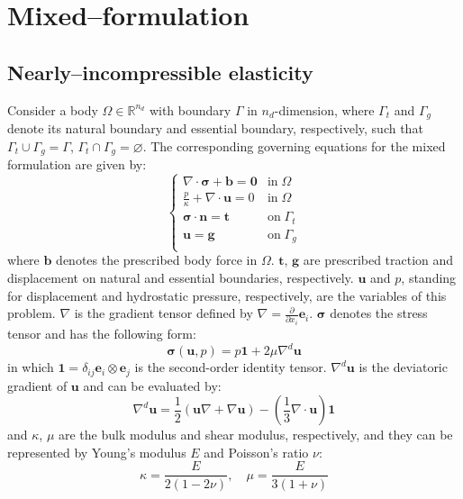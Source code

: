 \section{Mixed--formulation}
\subsection{Nearly--incompressible elasticity}
Consider a body $\Omega \in \mathbb{R}^{n_d}$ with boundary $\Gamma$ in $n_d$-dimension, where $\Gamma_t$ and $\Gamma_g$ denote its natural boundary and essential boundary, respectively, such that $\Gamma_t \cup \Gamma_g = \Gamma$, $\Gamma_t \cap \Gamma_g = \varnothing$. The corresponding governing equations for the mixed formulation are given by:
\begin{equation}\label{strong}
\begin{cases}
\nabla \cdot \boldsymbol{\sigma} + \boldsymbol{b} = \boldsymbol{0} & \mathrm{in} \; \Omega \\
\frac{p}{\kappa} + \nabla \cdot \boldsymbol{u} = 0 & \mathrm{in} \; \Omega \\
\boldsymbol{\sigma} \cdot \boldsymbol{n} = \boldsymbol{t} & \mathrm{on} \; \Gamma_t \\
\boldsymbol{u} = \boldsymbol{g} & \mathrm{on} \; \Gamma_g \\
\end{cases}
\end{equation}
where $\boldsymbol{b}$ denotes the prescribed body force in $\Omega$. $\boldsymbol{t}$, $\boldsymbol{g}$ are prescribed traction and displacement on natural and essential boundaries, respectively.
$\boldsymbol{u}$ and $p$, standing for displacement and hydrostatic pressure, respectively, are the variables of this problem.
$\nabla$ is the gradient tensor defined by $\nabla = \frac{\partial}{\partial x_i} \boldsymbol{e}_i$.
$\boldsymbol{\sigma}$ denotes the stress tensor and has the following form:
\begin{equation}\label{stress}
\boldsymbol{\sigma}(\boldsymbol{u}, p) = p \boldsymbol{1} + 2\mu \nabla^d \boldsymbol{u}
\end{equation}
in which $\boldsymbol{1} = \delta_{ij} \boldsymbol{e}_i \otimes \boldsymbol{e}_j$ is the second-order identity tensor. $\nabla^d \boldsymbol{u}$ is the deviatoric gradient of $\boldsymbol{u}$ and can be evaluated by:
\begin{equation}
\nabla^d \boldsymbol{u} = \frac{1}{2}(\boldsymbol{u} \nabla + \nabla \boldsymbol{u}) - (\frac{1}{3} \nabla \cdot \boldsymbol{u}) \boldsymbol{1}
\end{equation}
and $\kappa$, $\mu$ are the bulk modulus and shear modulus, respectively, and they can be represented by Young's modulus $E$ and Poisson's ratio $\nu$:
\begin{equation}\label{modulus}
\kappa = \frac{E}{2(1-2\nu)}, \quad \mu = \frac{E}{3(1+\nu)}
\end{equation}


